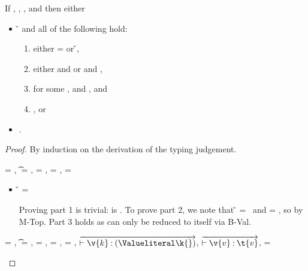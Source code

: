 \begin{lemma} \label{lemma:soundness}
If \judgement{\propenv{}}{\hastype{\e{}}{\t{}}}{\filterset{\thenprop{\prop{}}}{\elseprop{\prop{}}}}{\object{}},
\satisfies{\openv{}}{\propenv{}}, 
\isconsistent{\openv{}},
and \opsem {\openv{}} {\e{}} {\a{}} 
then either
\begin{itemize}
  \item
    \opsem {\openv{}} {\e{}} {\v{}} 
and all of the following hold:
\begin{enumerate}
  \item either \object{} = \emptyobject{} or \inopenv {\openv{}} {\object{}} {\v{}},
  \item either {\istrueval{\v{}}} and {\satisfies{\openv{}}{\thenprop{\prop{}}}} or 
               {\isfalseval{\v{}}} and {\satisfies{\openv{}}{\elseprop{\prop{}}}},
  \item \judgement{}{\hastype{\v{}}{\t{}}}{\filterset{\thenprop{\propp{}}}{\elseprop{\propp{}}}}{\objectp{}}
        for some \thenprop{\propp{}}, \elseprop{\propp{}} and {\objectp{}}, and
  \item \consistentwith{\v{}}{\openv{}}, or
\end{enumerate}

  \item
\opsem {\openv{}} {\e{}} {\errorvalv{}}.
\end{itemize}

\begin{proof}
By induction on the derivation of the typing judgement.

\begin{case}[T-True]
  \e{} = \true, \t{} = \True, \thenprop{\prop{}} = \topprop{}, \elseprop{\prop{}} = \botprop{}, \object{} = \emptyobject{}

  \begin{itemize}
    \item[] 
      \begin{subcase}[B-Val]
        \v{} = \true{}

        Proving part 1 is trivial: \object{} is \emptyobject. 
        To prove part 2, we note that \v{} = \true\ 
        and \thenprop{\prop{}} = \topprop{}, so \satisfies{\openv{}}{\thenprop{\prop{}}} by M-Top.
        Part 3 holds as \e{} can only be reduced to itself via B-Val.
      \end{subcase}
  \end{itemize}
\end{case}

\begin{case}[T-HMap] \e{} = {},
  \t{} = {\HMapc {\mandatory{}}},
  \thenprop{\prop{}} = {\topprop{}},
  \elseprop{\prop{}} = {\botprop{}},
  \object{} = {\emptyobject{}},
  $\overrightarrow{\judgementtwo {} {\hastype{\v{k}}{\Value \k{}}}}$,
  $\overrightarrow{\judgementtwo {} {\hastype{\v{v}}{\t{v}}}}$,
  \mandatory{} = 


\end{case}
\end{proof}
\end{lemma}
